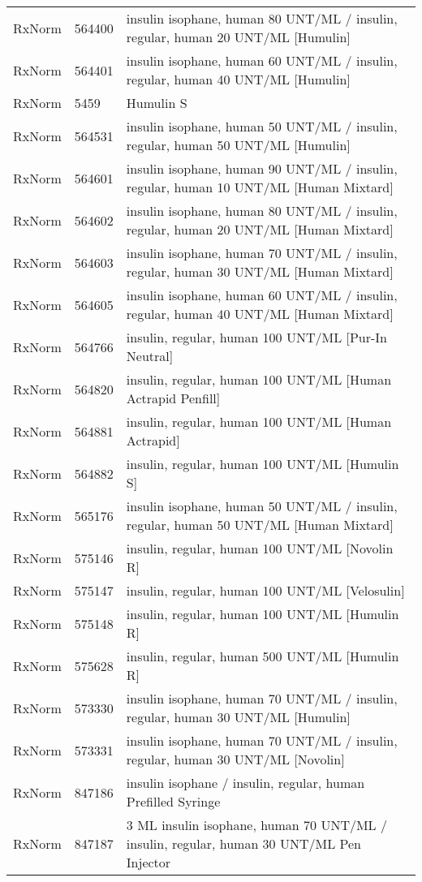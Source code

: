 \begin{longtable}{p{}p{}p{}}
  RxNorm & 564400 & insulin isophane, human 80 UNT/ML / insulin, regular, human 20 UNT/ML [Humulin] \\ 
  RxNorm & 564401 & insulin isophane, human 60 UNT/ML / insulin, regular, human 40 UNT/ML [Humulin] \\ 
  RxNorm & 5459 & Humulin S \\ 
  RxNorm & 564531 & insulin isophane, human 50 UNT/ML / insulin, regular, human 50 UNT/ML [Humulin] \\ 
  RxNorm & 564601 & insulin isophane, human 90 UNT/ML / insulin, regular, human 10 UNT/ML [Human Mixtard] \\ 
  RxNorm & 564602 & insulin isophane, human 80 UNT/ML / insulin, regular, human 20 UNT/ML [Human Mixtard] \\ 
  RxNorm & 564603 & insulin isophane, human 70 UNT/ML / insulin, regular, human 30 UNT/ML [Human Mixtard] \\ 
  RxNorm & 564605 & insulin isophane, human 60 UNT/ML / insulin, regular, human 40 UNT/ML [Human Mixtard] \\ 
  RxNorm & 564766 & insulin, regular, human 100 UNT/ML [Pur-In Neutral] \\ 
  RxNorm & 564820 & insulin, regular, human 100 UNT/ML [Human Actrapid Penfill] \\ 
  RxNorm & 564881 & insulin, regular, human 100 UNT/ML [Human Actrapid] \\ 
  RxNorm & 564882 & insulin, regular, human 100 UNT/ML [Humulin S] \\ 
  RxNorm & 565176 & insulin isophane, human 50 UNT/ML / insulin, regular, human 50 UNT/ML [Human Mixtard] \\ 
  RxNorm & 575146 & insulin, regular, human 100 UNT/ML [Novolin R] \\ 
  RxNorm & 575147 & insulin, regular, human 100 UNT/ML [Velosulin] \\ 
  RxNorm & 575148 & insulin, regular, human 100 UNT/ML [Humulin R] \\ 
  RxNorm & 575628 & insulin, regular, human 500 UNT/ML [Humulin R] \\ 
  RxNorm & 573330 & insulin isophane, human 70 UNT/ML / insulin, regular, human 30 UNT/ML [Humulin] \\ 
  RxNorm & 573331 & insulin isophane, human 70 UNT/ML / insulin, regular, human 30 UNT/ML [Novolin] \\ 
  RxNorm & 847186 & insulin isophane / insulin, regular, human Prefilled Syringe \\ 
  RxNorm & 847187 & 3 ML insulin isophane, human 70 UNT/ML / insulin, regular, human 30 UNT/ML Pen Injector \\ 

\end{longtable}
